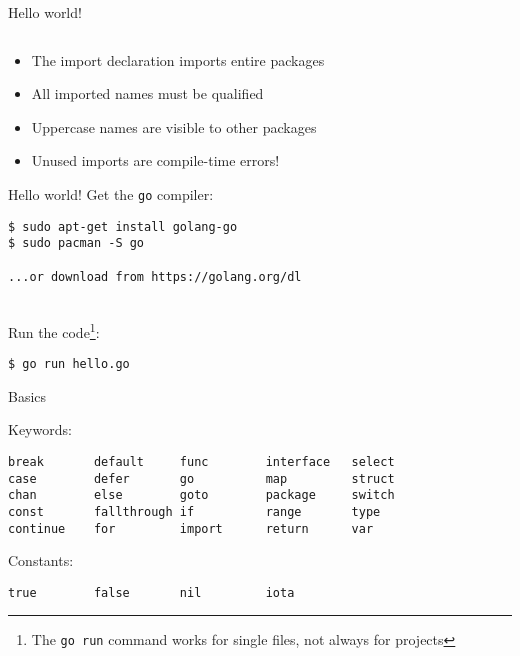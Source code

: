 \documentclass[10pt]{beamer}
\begin{document}
	\begin{frame}[t,fragile]{Hello world!}
		\inputminted{go}{code/01_hello.go}
		\vspace*{-4ex}
		\begin{itemize}
			\item The import declaration imports entire packages
			\item All imported names must be qualified
			\item Uppercase names are visible to other packages
			\item Unused imports are compile-time errors!
		\end{itemize}
\end{frame}
	
	
	\begin{frame}[t,fragile]{Hello world!}
		Get the \texttt{go} compiler:
		\begin{verbatim}
$ sudo apt-get install golang-go
$ sudo pacman -S go

...or download from https://golang.org/dl
		\end{verbatim}
		\\
		Run the code\footnote{The \texttt{go run} command works for single files, not always for projects}:
		\begin{verbatim}
$ go run hello.go
		\end{verbatim}
\end{frame}
	
	
	\begin{frame}[t,fragile]{Basics}
		\begin{center}
			Keywords:
		\end{center}
		\begin{verbatim}
break       default     func        interface   select
case        defer       go          map         struct
chan        else        goto        package     switch
const       fallthrough if          range       type
continue    for         import      return      var
		\end{verbatim}
		\vspace*{-4ex}
		\begin{center}
			Constants:
		\end{center}
		\begin{verbatim}
true        false       nil         iota
		\end{verbatim}
\end{frame}
\end{document}
